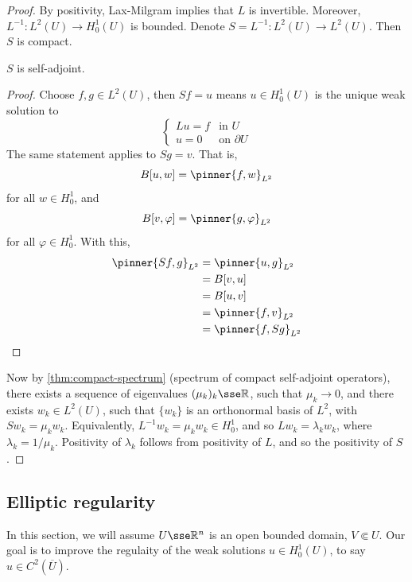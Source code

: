 \documentclass{article}
\begin{document}
\begin{proof}
    By positivity, Lax-Milgram implies that \(L\) is invertible. Moreover, \(L^{-1} : L^2(U) \to H^1_0(U)\) is bounded. Denote \(S = L^{-1} : L^2(U) \to L^2(U)\). Then \(S\) is compact.

    \begin{claim}
        \(S\) is self-adjoint.
    \end{claim}

    \begin{proof}
        Choose \(f, g \in L^2(U)\), then \(Sf = u\) means \(u \in H^1_0(U)\) is the unique weak solution to
        \[\begin{cases}
            Lu = f &\text{in }U \\
            u = 0&\text{on }\partial U
        \end{cases}\]
        The same statement applies to \(Sg = v\). That is,
        \[B[u, w] = \pinner{f, w}_{L^2}\]
        for all \(w \in H_0^1\), and
        \[B[v, \varphi] = \pinner{g, \varphi}_{L^2}\]
        for all \(\varphi \in H_0^1\). With this,
        \begin{align*}
            \pinner{Sf, g}_{L^2} &= \pinner{u, g}_{L^2} \\
            &= B[v, u] \\
            &= B[u, v] \\
            &= \pinner{f, v}_{L^2} \\
            &= \pinner{f, Sg}_{L^2}
        \end{align*}
    \end{proof}

    Now by \cref{thm:compact-spectrum} (spectrum of compact self-adjoint operators), there exists a sequence of eigenvalues \((\mu_k)_k \sse \R\), such that \(\mu_k \to 0\), and there exists \(w_k \in L^2(U)\), such that \(\{w_k\}\) is an orthonormal basis of \(L^2\), with \(S w_k = \mu_k w_k\). Equivalently, \(L^{-1}w_k = \mu_k w_k \in H^1_0\), and so \(Lw_k = \lambda_k w_k\), where \(\lambda_k = 1/\mu_k\). Positivity of \(\lambda_k\) follows from positivity of \(L\), and so the positivity of \(S\).
\end{proof}

\subsection{Elliptic regularity}

In this section, we will assume \(U \sse \R^n\) is an open bounded domain, \(V \Subset U\). Our goal is to improve the regulaity of the weak solutions \(u \in H^1_0(U)\), to say \(u \in C^2(\overline U)\).
\end{document}
